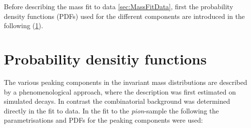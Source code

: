 Before describing the mass fit to data {\cref{sec:MassFitData}}, first the probability density functions (PDFs) used for the different components are introduced in the following (\cref{sec:PDFs}).

\section{Probability densitiy functions}
\label{sec:PDFs}

The various peaking components in the invariant mass distributions are described by a phenomenological approach, where the description was first
estimated on simulated decays.
In contrast the combinatorial background was determined directly in the fit to data.
In the fit to the \emph{pion}-sample the following the parametrisations and PDFs for the peaking components were used:

